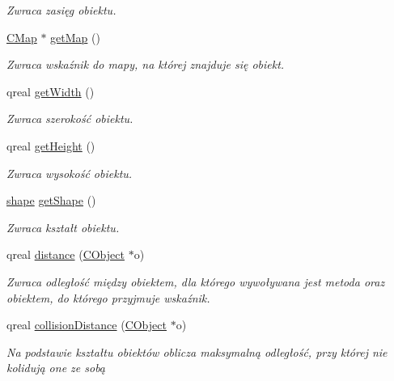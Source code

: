 \begin{DoxyCompactItemize}
\begin{DoxyCompactList}\small\item\em Zwraca zasięg obiektu. \end{DoxyCompactList}\item 
\mbox{\hyperlink{class_c_map}{C\+Map}} $\ast$ \mbox{\hyperlink{class_c_object_a57ea53dbd6d12a6da554f24d7b6c0d5d}{get\+Map}} ()
\begin{DoxyCompactList}\small\item\em Zwraca wskaźnik do mapy, na której znajduje się obiekt. \end{DoxyCompactList}\item 
qreal \mbox{\hyperlink{class_c_object_ad8e89183e35939476e2c6e0afb832f89}{get\+Width}} ()
\begin{DoxyCompactList}\small\item\em Zwraca szerokość obiektu. \end{DoxyCompactList}\item 
qreal \mbox{\hyperlink{class_c_object_ab1f242475368097db1eea253b9cc77e1}{get\+Height}} ()
\begin{DoxyCompactList}\small\item\em Zwraca wysokość obiektu. \end{DoxyCompactList}\item 
\mbox{\hyperlink{cobject_8h_a45cde9abb508c62d67c3bb2b9bf566a5}{shape}} \mbox{\hyperlink{class_c_object_aca839368d91bd68f3d46288316a86807}{get\+Shape}} ()
\begin{DoxyCompactList}\small\item\em Zwraca kształt obiektu. \end{DoxyCompactList}\item 
qreal \mbox{\hyperlink{class_c_object_a451ca4149ae1de4dfe39370c3abbe919}{distance}} (\mbox{\hyperlink{class_c_object}{C\+Object}} $\ast$o)
\begin{DoxyCompactList}\small\item\em Zwraca odległość między obiektem, dla którego wywoływana jest metoda oraz obiektem, do którego przyjmuje wskaźnik. \end{DoxyCompactList}\item 
qreal \mbox{\hyperlink{class_c_object_aabaf82a62b691b0666a0bbe9431d3b22}{collision\+Distance}} (\mbox{\hyperlink{class_c_object}{C\+Object}} $\ast$o)
\begin{DoxyCompactList}\small\item\em Na podstawie kształtu obiektów oblicza maksymalną odległość, przy której nie kolidują one ze sobą \end{DoxyCompactList}\item 

\end{DoxyCompactItemize}
